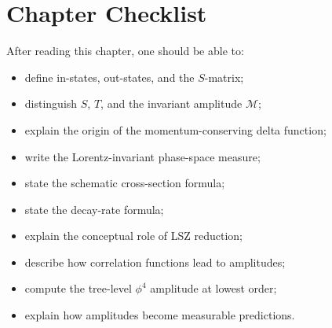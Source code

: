 \section{Chapter Checklist}

After reading this chapter, one should be able to:
\begin{itemize}
    \item define in-states, out-states, and the \(S\)-matrix;
    \item distinguish \(S\), \(T\), and the invariant amplitude \(\mathcal{M}\);
    \item explain the origin of the momentum-conserving delta function;
    \item write the Lorentz-invariant phase-space measure;
    \item state the schematic cross-section formula;
    \item state the decay-rate formula;
    \item explain the conceptual role of LSZ reduction;
    \item describe how correlation functions lead to amplitudes;
    \item compute the tree-level \(\phi^4\) amplitude at lowest order;
    \item explain how amplitudes become measurable predictions.
\end{itemize}
